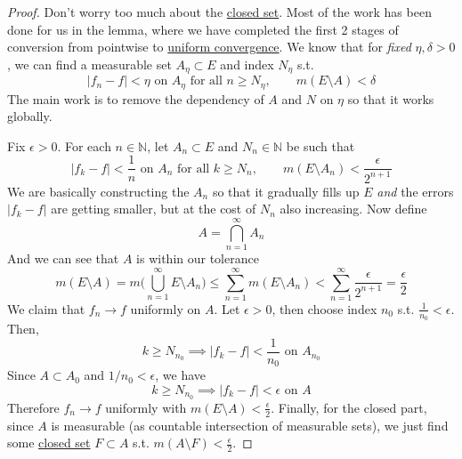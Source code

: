   \begin{proof}
    Don't worry too much about the \hyperref[pst-def:closed]{closed set}. Most of the work has been done for us in the lemma, where we have completed the first 2 stages of conversion from pointwise to \hyperref[real-def:uniform-convergence]{uniform convergence}. We know that for \textit{fixed} $\eta, \delta > 0$, we can find a measurable set $A_\eta \subset E$ and index $N_\eta$ s.t. 
    \begin{equation}
      |f_n - f| < \eta \text{ on } A_\eta \text{ for all } n \geq N_\eta, \qquad m(E \setminus A) < \delta
    \end{equation}
    The main work is to remove the dependency of $A$ and $N$ on $\eta$ so that it works globally. 

    Fix $\epsilon > 0$. For each $n \in \mathbb{N}$, let $A_n \subset E$ and $N_n \in \mathbb{N}$ be such that 
    \begin{equation}
      |f_k - f| < \frac{1}{n} \text{ on } A_n \text{ for all } k \geq N_n, \qquad m(E \setminus A_n) < \frac{\epsilon}{2^{n+1}}
    \end{equation}
    We are basically constructing the $A_n$ so that it gradually fills up $E$ \textit{and} the errors $|f_k - f|$ are getting smaller, but at the cost of $N_n$ also increasing. Now define 
    \begin{equation}
      A = \bigcap_{n=1}^\infty A_n 
    \end{equation}
    And we can see that $A$ is within our tolerance 
    \begin{equation}
      m(E \setminus A) = m \bigg( \bigcup_{n=1}^\infty E \setminus A_n \bigg) \leq \sum_{n=1}^\infty m (E \setminus A_n) < \sum_{n=1}^\infty \frac{\epsilon}{2^{n+1}} = \frac{\epsilon}{2}
    \end{equation}
    We claim that $f_n \to f$ uniformly on $A$. Let $\epsilon > 0$, then choose index $n_0$ s.t. $\frac{1}{n_0} < \epsilon$. Then, 
    \begin{equation}
      k \geq N_{n_0} \implies |f_k - f| < \frac{1}{n_0} \text{ on } A_{n_0} 
    \end{equation}
    Since $A \subset A_0$ and $1/n_0 < \epsilon$, we have 
    \begin{equation}
      k \geq N_{n_0} \implies |f_k - f| < \epsilon \text{ on } A 
    \end{equation}
    Therefore $f_n \to f$ uniformly with $m(E \setminus A) < \frac{\epsilon}{2}$. Finally, for the closed part, since $A$ is measurable (as countable intersection of measurable sets), we just find some \hyperref[pst-def:closed]{closed set} $F \subset A$ s.t. $m(A \setminus F) < \frac{\epsilon}{2}$. 
  \end{proof}


